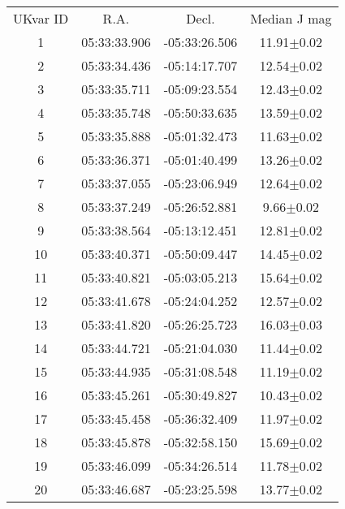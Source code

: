 \begin{table}
\begin{tabular}{cccc}
UKvar ID & R.A. & Decl. & Median J mag \\
1 & 05:33:33.906 & -05:33:26.506 & 11.91$\pm$0.02 \\
2 & 05:33:34.436 & -05:14:17.707 & 12.54$\pm$0.02 \\
3 & 05:33:35.711 & -05:09:23.554 & 12.43$\pm$0.02 \\
4 & 05:33:35.748 & -05:50:33.635 & 13.59$\pm$0.02 \\
5 & 05:33:35.888 & -05:01:32.473 & 11.63$\pm$0.02 \\
6 & 05:33:36.371 & -05:01:40.499 & 13.26$\pm$0.02 \\
7 & 05:33:37.055 & -05:23:06.949 & 12.64$\pm$0.02 \\
8 & 05:33:37.249 & -05:26:52.881 & 9.66$\pm$0.02 \\
9 & 05:33:38.564 & -05:13:12.451 & 12.81$\pm$0.02 \\
10 & 05:33:40.371 & -05:50:09.447 & 14.45$\pm$0.02 \\
11 & 05:33:40.821 & -05:03:05.213 & 15.64$\pm$0.02 \\
12 & 05:33:41.678 & -05:24:04.252 & 12.57$\pm$0.02 \\
13 & 05:33:41.820 & -05:26:25.723 & 16.03$\pm$0.03 \\
14 & 05:33:44.721 & -05:21:04.030 & 11.44$\pm$0.02 \\
15 & 05:33:44.935 & -05:31:08.548 & 11.19$\pm$0.02 \\
16 & 05:33:45.261 & -05:30:49.827 & 10.43$\pm$0.02 \\
17 & 05:33:45.458 & -05:36:32.409 & 11.97$\pm$0.02 \\
18 & 05:33:45.878 & -05:32:58.150 & 15.69$\pm$0.02 \\
19 & 05:33:46.099 & -05:34:26.514 & 11.78$\pm$0.02 \\
20 & 05:33:46.687 & -05:23:25.598 & 13.77$\pm$0.02 \\
\end{tabular}
\end{table}
